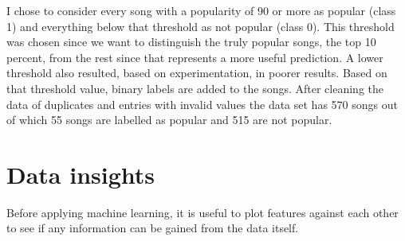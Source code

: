 I chose to consider every song with a popularity of 90 or more as popular (class 1) and everything below that threshold as not popular (class 0). This threshold was chosen since we want to distinguish the truly popular songs, the top 10 percent, from the rest since that represents a more useful prediction. A lower threshold also resulted, based on experimentation, in poorer results. Based on that threshold value, binary labels are added to the songs. After cleaning the data of duplicates and entries with invalid values the data set has 570 songs out of which 55 songs are labelled as popular and 515 are not popular.

\section{Data insights}
Before applying machine learning, it is useful to plot features against each other to see if any information can be gained from the data itself.

